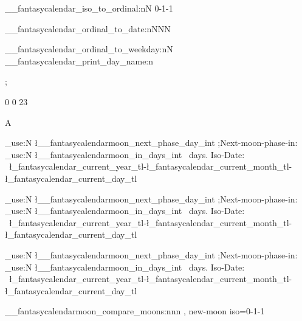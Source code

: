 \documentclass[paper=landscape]{scrartcl}
\begin{document}
\ExplSyntaxOn


\newcount\cnta
\newcount\cntday
\__fantasycalendar_iso_to_ordinal:nN { 0-1-1 } \cnta

\the \cnta

\__fantasycalendar_ordinal_to_date:nNNN { \cnta } \theyear \themonth \theday

\par
\the \cnta
\space\theyear \space \themonth \space \theday
\par
\__fantasycalendar_ordinal_to_weekday:nN { \cnta } \cntday
\the\cntday
\__fantasycalendar_print_day_name:n{\cntday}

\par



\par
\newpage
\tikzpicture\PrintFantasycalendarBase[months=0-1 to 0-1, week~list, box ~  size=2cm,days={rectangle,draw},month ~ label ~ above ~ centered];\endtikzpicture

\newpage

\DefineNewMoon{} { 0 }
\NewFantasyMoon {} { 0 }
\NewFantasyMoon {} { 23 }

A
\par

  {  \int_use:N \l__fantasycalendarmoon_next_phase_day_int ;Next-moon-phase-in: \space \int_use:N \l__fantasycalendarmoon_in_days_int \ days. Iso-Date: \ \l_fantasycalendar_current_year_tl-\l_fantasycalendar_current_month_tl-\l_fantasycalendar_current_day_tl \par}

  {  \int_use:N \l__fantasycalendarmoon_next_phase_day_int ;Next-moon-phase-in: \space \int_use:N \l__fantasycalendarmoon_in_days_int \ days. Iso-Date: \ \l_fantasycalendar_current_year_tl-\l_fantasycalendar_current_month_tl-\l_fantasycalendar_current_day_tl \par}

  {  \int_use:N \l__fantasycalendarmoon_next_phase_day_int ;Next-moon-phase-in: \space \int_use:N \l__fantasycalendarmoon_in_days_int \ days. Iso-Date: \ \l_fantasycalendar_current_year_tl-\l_fantasycalendar_current_month_tl-\l_fantasycalendar_current_day_tl \par}

\par

\__fantasycalendarmoon_compare_moons:nnn { \Solena, \Eria } { new-moon } { iso=0-1-1 }


\newpage
\end{document}

